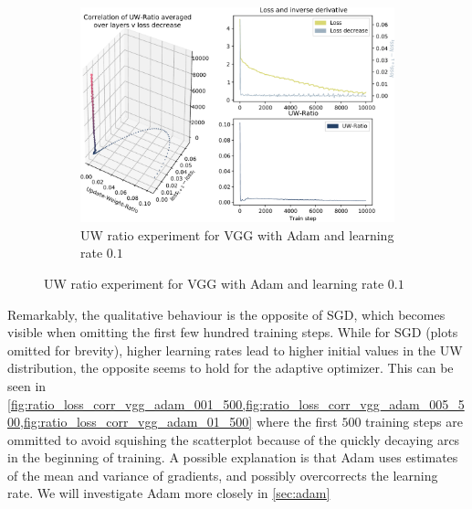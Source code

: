 \begin{figure}
    \begin{subfigure}{\textwidth}
        \centering
        \includegraphics[width=\linewidth]{gfx/diagrams/experiments/ratio_loss_correlation/vgg_adam_01_0_10000.pdf}
        \caption{UW ratio experiment for VGG with Adam and learning rate $0.1$}
        \label{fig:ratio_loss_corr_vgg_adam_01}
    \end{subfigure}
\end{figure}

Remarkably, the qualitative behaviour is the opposite of SGD, which becomes visible
when omitting the first few hundred training steps. While for SGD (plots omitted
for brevity), higher learning rates lead to higher initial values in the UW
distribution, the opposite seems to hold for the adaptive optimizer. This can be
seen in
\cref{fig:ratio_loss_corr_vgg_adam_001_500,fig:ratio_loss_corr_vgg_adam_005_500,fig:ratio_loss_corr_vgg_adam_01_500}
where the first $500$ training steps are ommitted to avoid squishing the
scatterplot because of the quickly decaying arcs in the beginning of training.
A possible explanation is that Adam uses estimates of the mean and variance of
gradients, and possibly overcorrects the learning rate. We will investigate Adam
more closely in \cref{sec:adam}

